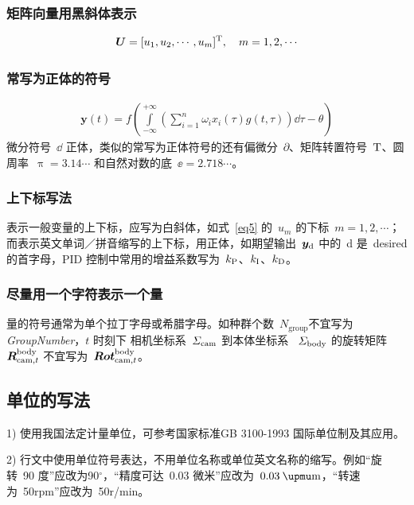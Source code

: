 \documentclass{JQRnew}
\begin{document}
\subsubsection{矩阵向量用黑斜体表示}

\noindent
\begin{align}
\label{eq5}
\bm{U}=[u_{1},u_{2},\cdots,u_{m}]^{\rm T},\quad  m=1,2,\cdots
\end{align}

\subsubsection{常写为正体的符号}
\noindent
\begin{align}
\label{eq6}
\bm{y}(t)=f\left(\int\limits_{-\infty}^{+\infty} \left(\sum\limits_{i=1}^n \omega_{i} x_{i} (\tau) g(t,\tau)\right) \dd \tau -\theta\right)
\end{align}
微分符号~$\dd $ 正体，类似的常写为正体符号的还有偏微分~$\partial $、矩阵转置符号~$\rm T$、圆周率~$\uppi =3.14\cdots$ 和自然对数的底~$\ee =2.718\cdots $。

\subsubsection{上下标写法}

表示一般变量的上下标，应写为白斜体，如式~\eqref{eq5} 的~$ u_{m}$ 的下标~$ m=1,2,\cdots $；而表示英文单词\!／\!拼音缩写的上下标，用正体，如期望输出~$\bm{y}_{\rm d}$ 中的~d 是~desired 的首字母，PID 控制中常用的增益系数写为~$ k_{\rm P}$、$k_{\rm I}$、$ k_{\rm D}$。

\subsubsection{尽量用一个字符表示一个量}

量的符号通常为单个拉丁字母或希腊字母。如种群个数~$N_{\text{group}}$不宜写为\textit{GroupNumber}，$t$ 时刻下 相机坐标系~$\varSigma _{\rm cam}$ 到本体坐标系 ~$\varSigma _{\rm body}$ 的旋转矩阵${\bm R}_{{\rm cam},t} ^{\rm body}$ 不宜写为~${\bm {Rot}}_{{\rm cam},t} ^{\rm body}$。

\subsection{单位的写法}

1) 使用我国法定计量单位，可参考国家标准GB 3100-1993 国际单位制及其应用。

2) 行文中使用单位符号表达，不用单位名称或单位英文名称的缩写。例如“旋转~90 度”应改为90$^{\circ}$，“精度可达~0.03 微米”应改为~$0.03\:{\rm \upmu m}$，“转速为~50\:rpm”应改为~50\:r/min。
\end{document}
